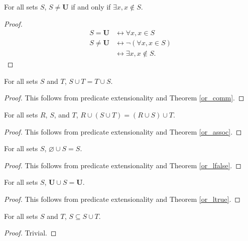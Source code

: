 \documentclass[../math.tex]{subfiles}
\begin{document}
\begin{theorem} \label{all_neq}
    For all sets $S$, $S \neq \bm U$ if and only if $\exists x, x \notin S$.
\end{theorem}
\begin{proof}
    \begin{align*}
        S = \bm U &\leftrightarrow \forall x, x \in S \\
        S \neq \bm U &\leftrightarrow \neg(\forall x, x \in S) \\
                 &\leftrightarrow \exists x, x \notin S.
    \end{align*}
\end{proof}

\begin{theorem} \label{union_comm}
    For all sets $S$ and $T$, $S \cup T = T \cup S$.
\end{theorem}
\begin{proof}
    This follows from predicate extensionality and Theorem \ref{or_comm}.
\end{proof}

\begin{theorem} \label{union_assoc}
    For all sets $R$, $S$, and $T$, $R \cup (S \cup T) = (R \cup S) \cup T$.
\end{theorem}
\begin{proof}
    This follows from predicate extensionality and Theorem \ref{or_assoc}.
\end{proof}

\begin{theorem} \label{union_lid}
    For all sets $S$, $\varnothing \cup S = S$.
\end{theorem}
\begin{proof}
    This follows from predicate extensionality and Theorem \ref{or_lfalse}.
\end{proof}

\begin{theorem} \label{union_lanni}
    For all sets $S$, $\bm U \cup S = \bm U$.
\end{theorem}
\begin{proof}
    This follows from predicate extensionality and Theorem \ref{or_ltrue}.
\end{proof}

\begin{theorem} \label{union_lsub}
    For all sets $S$ and $T$, $S \subseteq S \cup T$.
\end{theorem}
\begin{proof}
    Trivial.
\end{proof}
\end{document}
